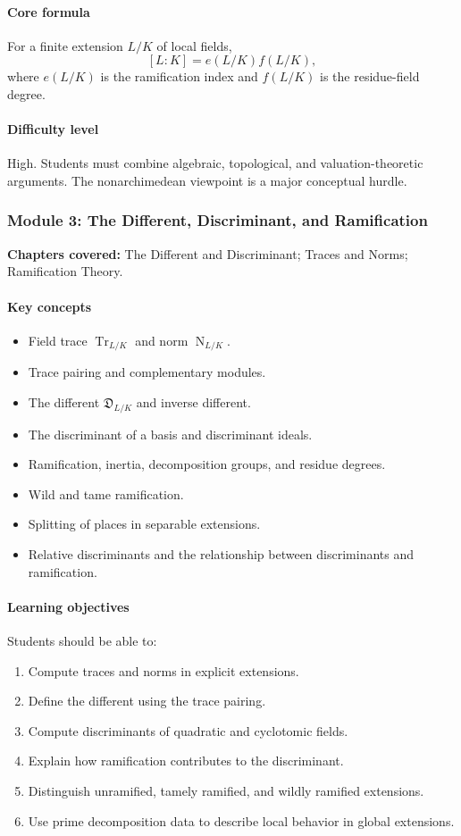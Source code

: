 \documentclass[11pt]{article}
\newcommand{\Norm}{\operatorname{N}}
\newcommand{\Tr}{\operatorname{Tr}}
\begin{document}
\paragraph{Core formula}
For a finite extension $L/K$ of local fields,
\[
[L:K] = e(L/K)f(L/K),
\]
where $e(L/K)$ is the ramification index and $f(L/K)$ is the residue-field degree.

\paragraph{Difficulty level}
High. Students must combine algebraic, topological, and valuation-theoretic arguments. The nonarchimedean viewpoint is a major conceptual hurdle.

\subsubsection*{Module 3: The Different, Discriminant, and Ramification}

\textbf{Chapters covered:} The Different and Discriminant; Traces and Norms; Ramification Theory.

\paragraph{Key concepts}
\begin{itemize}
    \item Field trace $\Tr_{L/K}$ and norm $\Norm_{L/K}$.
    \item Trace pairing and complementary modules.
    \item The different $\mathfrak{D}_{L/K}$ and inverse different.
    \item The discriminant of a basis and discriminant ideals.
    \item Ramification, inertia, decomposition groups, and residue degrees.
    \item Wild and tame ramification.
    \item Splitting of places in separable extensions.
    \item Relative discriminants and the relationship between discriminants and ramification.
\end{itemize}

\paragraph{Learning objectives}
Students should be able to:
\begin{enumerate}
    \item Compute traces and norms in explicit extensions.
    \item Define the different using the trace pairing.
    \item Compute discriminants of quadratic and cyclotomic fields.
    \item Explain how ramification contributes to the discriminant.
    \item Distinguish unramified, tamely ramified, and wildly ramified extensions.
    \item Use prime decomposition data to describe local behavior in global extensions.
\end{enumerate}
\end{document}
